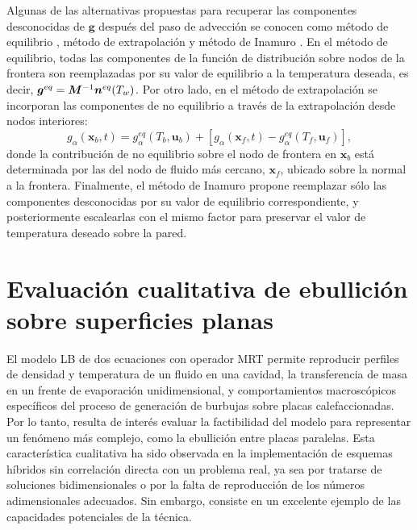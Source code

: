 Algunas de las alternativas propuestas para recuperar las componentes desconocidas de $\bm{g}$ despu\'es del paso de advecci\'on se conocen como m\'etodo de equilibrio \cite{kruger_lattice_2017}, m\'etodo de extrapolaci\'on \cite{guo_extrapolation_2002} y m\'etodo de Inamuro \cite{inamuro_lattice_2002}. En el m\'etodo de equilibrio, todas las componentes de la funci\'on de distribuci\'on sobre nodos de la frontera son reemplazadas por su valor de equilibrio a la temperatura deseada, es decir, $\bm{g}^{eq} = \bm{M}^{-1}\bm{n}^{eq}(T_w)$.  Por otro lado, en el m\'etodo de extrapolaci\'on se incorporan las componentes de no equilibrio a trav\'es de la extrapolaci\'on desde nodos interiores:
\begin{equation}
	g_{\alpha}(\bm{x}_b,t) = g_{\alpha}^{eq}(T_b, \bm{u}_b) + \left[ g_{\alpha}(\bm{x}_f,t) - g_{\alpha}^{eq}(T_f, \bm{u}_f)\right],
\end{equation}
donde la contribuci\'on de no equilibrio sobre el nodo de frontera en $\bm{x}_b$ est\'a determinada por las del nodo de fluido m\'as cercano, $\bm{x}_f$, ubicado sobre la normal a la frontera. Finalmente, el m\'etodo de Inamuro propone reemplazar s\'olo las componentes desconocidas por su valor de equilibrio correspondiente, y posteriormente escalearlas con el mismo factor para preservar el valor de temperatura deseado sobre la pared.







\section{Evaluaci\'on cualitativa de ebullici\'on sobre superficies planas}

El modelo LB de dos ecuaciones con operador MRT permite reproducir perfiles de densidad y temperatura de un fluido en una cavidad, la transferencia de masa en un frente de evaporaci\'on unidimensional, y comportamientos macrosc\'opicos espec\'ificos del proceso de generaci\'on de burbujas sobre placas calefaccionadas. Por lo tanto, resulta de inter\'es evaluar la factibilidad del modelo para representar un fen\'omeno m\'as complejo, como la ebullici\'on entre placas paralelas. Esta caracter\'istica cualitativa ha sido observada en la implementaci\'on de esquemas h\'ibridos \cite{li_lattice_2015, fei_mesoscopic_2020} sin correlaci\'on directa con un problema real, ya sea por tratarse de soluciones bidimensionales o por la falta de reproducci\'on de los n\'umeros adimensionales adecuados. Sin embargo, consiste en un excelente ejemplo de las capacidades potenciales de la t\'ecnica.

